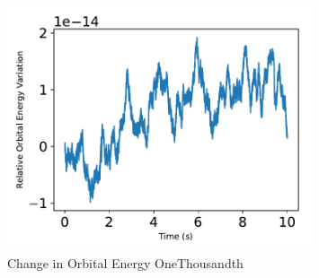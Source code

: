 \begin{figure}[htbp]\centerline{\includegraphics[width=0.8\textwidth]{AutoTeX/ChangeInOrbitalEnergyOneThousandth}}\caption{Change in Orbital Energy OneThousandth}\label{fig:ChangeInOrbitalEnergyOneThousandth}\end{figure}